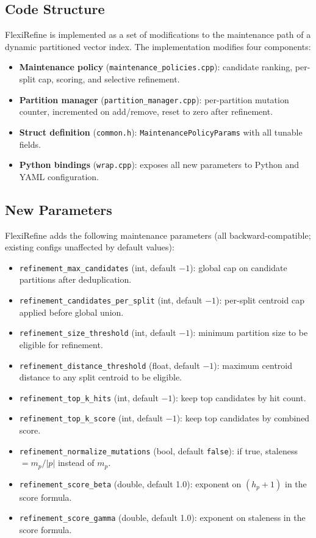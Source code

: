 \documentclass[sigconf, nonacm]{acmart}
\newcommand{\system}{FlexiRefine\xspace}
\begin{document}
\subsection{Code Structure}

\system is implemented as a set of modifications to the maintenance
path of a dynamic partitioned vector index. The implementation
modifies four components:

\begin{itemize}[leftmargin=*]
  \item \textbf{Maintenance policy} (\texttt{maintenance\_policies.cpp}):
    candidate ranking, per-split cap, scoring, and selective refinement.
  \item \textbf{Partition manager} (\texttt{partition\_manager.cpp}):
    per-partition mutation counter, incremented on add/remove,
    reset to zero after refinement.
  \item \textbf{Struct definition} (\texttt{common.h}):
    \texttt{MaintenancePolicyParams} with all tunable fields.
  \item \textbf{Python bindings} (\texttt{wrap.cpp}):
    exposes all new parameters to Python and YAML configuration.
\end{itemize}

\subsection{New Parameters}

\system adds the following maintenance parameters
(all backward-compatible; existing configs unaffected by default values):

\begin{itemize}[leftmargin=*]
  \item \texttt{refinement\_max\_candidates} (int, default $-1$):
    global cap on candidate partitions after deduplication.
  \item \texttt{refinement\_candidates\_per\_split} (int, default $-1$):
    per-split centroid cap applied before global union.
  \item \texttt{refinement\_size\_threshold} (int, default $-1$):
    minimum partition size to be eligible for refinement.
  \item \texttt{refinement\_distance\_threshold} (float, default $-1$):
    maximum centroid distance to any split centroid to be eligible.
  \item \texttt{refinement\_top\_k\_hits} (int, default $-1$):
    keep top candidates by hit count.
  \item \texttt{refinement\_top\_k\_score} (int, default $-1$):
    keep top candidates by combined score.
  \item \texttt{refinement\_normalize\_mutations} (bool, default \texttt{false}):
    if true, staleness $= m_p / |p|$ instead of $m_p$.
  \item \texttt{refinement\_score\_beta} (double, default 1.0):
    exponent on $(h_p + 1)$ in the score formula.
  \item \texttt{refinement\_score\_gamma} (double, default 1.0):
    exponent on staleness in the score formula.
\end{itemize}
\end{document}
